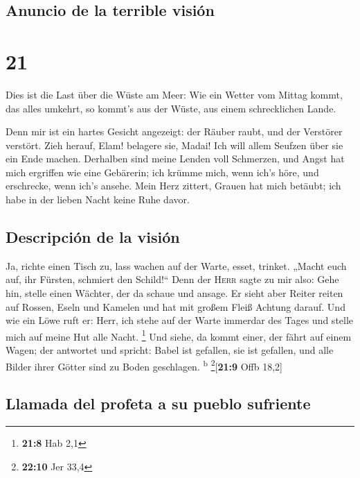\hypertarget{anuncio-de-la-terrible-visiuxf3n}{%
\subsection{Anuncio de la terrible
visión}\label{anuncio-de-la-terrible-visiuxf3n}}

\hypertarget{section-20}{%
\section{21}\label{section-20}}

 Dies ist die Last über die Wüste am Meer: Wie ein Wetter
vom Mittag kommt, das alles umkehrt, so kommt's aus der Wüste, aus einem
schrecklichen Lande.

 Denn mir ist ein hartes Gesicht angezeigt: der Räuber
raubt, und der Verstörer verstört. Zieh herauf, Elam! belagere sie,
Madai! Ich will allem Seufzen über sie ein Ende machen. 
Derhalben sind meine Lenden voll Schmerzen, und Angst hat mich ergriffen
wie eine Gebärerin; ich krümme mich, wenn ich's höre, und erschrecke,
wenn ich's ansehe.  Mein Herz zittert, Grauen hat mich
betäubt; ich habe in der lieben Nacht keine Ruhe davor.

\hypertarget{descripciuxf3n-de-la-visiuxf3n}{%
\subsection{Descripción de la
visión}\label{descripciuxf3n-de-la-visiuxf3n}}

 Ja, richte einen Tisch zu, lass wachen auf der Warte,
esset, trinket. „Macht euch auf, ihr Fürsten, schmiert den Schild!{}``
 Denn der \textsc{Herr} sagte zu mir also: Gehe hin,
stelle einen Wächter, der da schaue und ansage.  Er sieht
aber Reiter reiten auf Rossen, Eseln und Kamelen und hat mit großem
Fleiß Achtung darauf.  Und wie ein Löwe ruft er: Herr, ich
stehe auf der Warte immerdar des Tages und stelle mich auf meine Hut
alle Nacht. \footnote{\textbf{21:8} Hab 2,1}  Und siehe,
da kommt einer, der fährt auf einem Wagen; der antwortet und spricht:
Babel ist gefallen, sie ist gefallen, und alle Bilder ihrer Götter sind
zu Boden geschlagen. \textsuperscript{b} \footnote{\textbf{22:10} Jer
  33,4}{[}\textbf{21:9} Offb 18,2{]}

\hypertarget{llamada-del-profeta-a-su-pueblo-sufriente}{%
\subsection{Llamada del profeta a su pueblo
sufriente}\label{llamada-del-profeta-a-su-pueblo-sufriente}}


